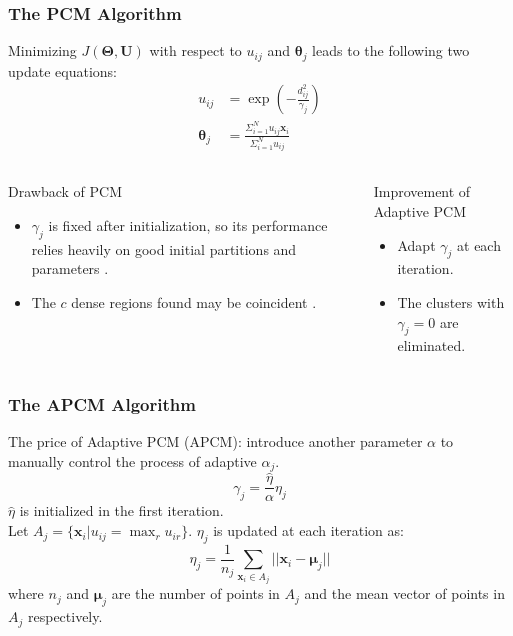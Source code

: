 \documentclass{beamer}
\begin{document}
\begin{frame}
  \frametitle{The PCM Algorithm}
  Minimizing $J(\mathbf{\Theta},\mathbf{U})$ with respect to $u_{ij}$
  and $\boldsymbol{\theta}_j$ leads to the following two update
  equations:
  \begin{align}
    u_{ij}&=\exp\left(-\frac{d^2_{ij}}{\gamma_j}\right) \label{pcm_u_update}  \\
    \boldsymbol{\theta}_j&=\frac{\Sigma_{i=1}^Nu_{ij}\mathbf{x}_i}{\Sigma_{i=1}^Nu_{ij}} \label{pcm_theta_update}    
  \end{align}
\end{frame}

\begin{frame}
  \begin{columns}[t]
    
    \begin{block}{Drawback of PCM}
      \begin{itemize}
      \item $\gamma_j$ is fixed after initialization, so its
        performance relies heavily on good initial partitions and
        parameters \cite{nasraoui_improved_1996}.
      \item<2> The $c$ dense regions found may be coincident
        \cite{barni_comments_1996}.
      \end{itemize}
    \end{block}

    \begin{block}{Improvement of Adaptive PCM
        \cite{xenaki_novel_2016}}
      \begin{itemize}
      \item Adapt $\gamma_j$ at each iteration.  \vskip2cm
      \item<2> The clusters with $\gamma_j=0$ are eliminated.
      \end{itemize}
    \end{block}
  \end{columns}
\end{frame}

\begin{frame}
  \frametitle{The APCM Algorithm}
  The price of Adaptive PCM (APCM): introduce another parameter
  $\alpha$ to manually control the process of adaptive $\alpha_j$.
  \begin{equation}
    \label{corrected_eta}
    \gamma_j=\frac{\hat{\eta}}{\alpha}\eta_j
  \end{equation}
  $\hat{\eta}$ is initialized in the first iteration. \\
  Let $A_j=\{\mathbf{x}_i|u_{ij}=\max_r u_{ir}\}$. $\eta_j$ is updated
  at each iteration as:
  \begin{equation}
    \label{apcm_eta_update}
    \eta_j=\frac{1}{n_j}\sum_{\mathbf{x}_i\in A_j}||\mathbf{x}_i-\boldsymbol{\mu}_j||
  \end{equation}
  where $n_j$ and $\boldsymbol{\mu}_j$ are the number of points in
  $A_j$ and the mean vector of points in $A_j$ respectively.
\end{frame}
\end{document}
